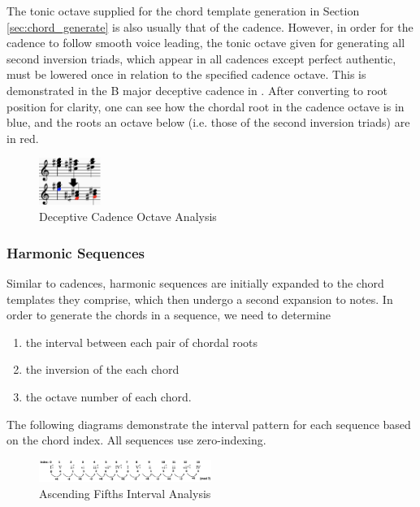 \documentclass{article}
\begin{document}
The tonic octave supplied for the chord template generation in Section \ref{sec:chord_generate} is also usually that of the cadence. However, in order for the cadence to follow smooth voice leading, the tonic octave given for generating all second inversion triads, which appear in all cadences except perfect authentic, must be lowered once in relation to the specified cadence octave. This is demonstrated in the B major deceptive cadence in . After converting to root position for clarity, one can see how the chordal root in the cadence octave is in blue, and the roots an octave below (i.e. those of the second inversion triads) are in red.

\begin{figure}[h!]
\centering
\includegraphics[width=0.18\textwidth]{images/cadence_octaves}
  \caption{Deceptive Cadence Octave Analysis}\label{fig:cadence_octaves}
\end{figure}

\subsubsection{Harmonic Sequences}
Similar to cadences, harmonic sequences are initially expanded to the chord templates they comprise, which then undergo a second expansion to notes. In order to generate the chords in a sequence, we need to determine 
\begin{enumerate}
\item the interval between each pair of chordal roots
\item the inversion of the each chord
\item the octave number of each chord.
\end{enumerate}

The following diagrams demonstrate the interval pattern for each sequence based on the chord index. All sequences use zero-indexing. 

\begin{figure}[h!]
\centering
\includegraphics[width=0.5\textwidth]{images/asc_fifths_intervals}
  \caption{Ascending Fifths Interval Analysis}
\end{figure}
\end{document}
